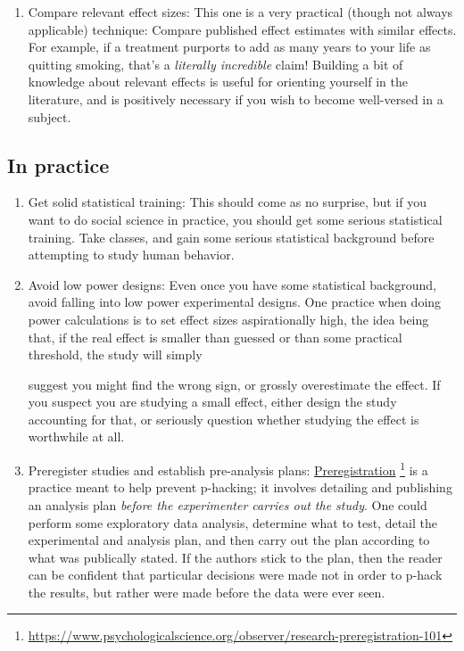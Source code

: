 \documentclass{tufte-handout}
\begin{document}
\begin{enumerate}
\item Compare relevant effect sizes:
\label{sec:orga74595a}
This one is a very practical (though not always applicable) technique: Compare
published effect estimates with similar effects. For example, if a treatment
purports to add as many years to your life as quitting smoking, that's a
\emph{literally incredible} claim! Building a bit of knowledge about relevant effects
is useful for orienting yourself in the literature, and is positively necessary
if you wish to become well-versed in a subject.
\end{enumerate}

\subsection{In practice}
\label{sec:org41b0bc8}
\begin{enumerate}
\item Get solid statistical training:
\label{sec:orge90a6b5}
This should come as no surprise, but if you want to do social science in
practice, you should get some serious statistical training. Take classes, and
gain some serious statistical background before attempting to study human
behavior.
\item Avoid low power designs:
\label{sec:org80b1809}
Even once you have some statistical background, avoid falling into low power
experimental designs. One practice when doing power calculations is to set
effect sizes aspirationally high, the idea being that, if the real effect is
smaller than guessed or than some practical threshold, the study will simply

suggest you might find the wrong sign, or grossly overestimate the effect. If
you suspect you are studying a small effect, either design the study accounting
for that, or seriously question whether studying the effect is worthwhile at
all.
\item Preregister studies and establish pre-analysis plans:
\label{sec:org1a43850}
\href{https://www.psychologicalscience.org/observer/research-preregistration-101}{Preregistration}
\footnote{\url{https://www.psychologicalscience.org/observer/research-preregistration-101}}
is  a practice  meant  to  help prevent  p-hacking;  it  involves detailing  and
publishing an analysis plan \emph{before the experimenter carries out the study}. One
could perform some exploratory data analysis, determine what to test, detail the
experimental and  analysis plan, and then  carry out the plan  according to what
was publically stated. If the authors stick  to the plan, then the reader can be
confident  that particular  decisions  were  made not  in  order  to p-hack  the
results, but rather were made before the data were ever seen.
\end{enumerate}
\end{document}

